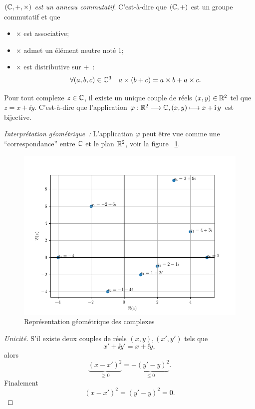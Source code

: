 \begin{prop}
    \emph{\((\mathbb{C},+,\times)\) est un anneau commutatif}. C'est-à-dire que 
    \((\mathbb{C},+)\) est un groupe commutatif et que
    \begin{itemize}
        \item \(\times\) est associative;
        \item \(\times\) admet un élément neutre noté \(1\);
        \item \(\times\) est distributive sur \(+\)~:
            \begin{equation}
                \forall (a,b,c) \in \mathbb{C}^3 \quad a \times (b+c)=a \times b+ a 
                \times c.
            \end{equation}
    \end{itemize}
\end{prop}
\begin{prop}
    Pour tout complexe \(z \in \mathbb{C}\), il existe un unique couple de réels \((x,y) 
    \in \mathbb{R}^2\) tel que \(z=x+\ii y\). C'est-à-dire que l'application 
    \(\varphi:\mathbb{R}^2 \longrightarrow \mathbb{C}, (x,y) \longmapsto x+\operatorname{i} y\) est bijective.
\end{prop}
\emph{Interprétation géométrique~:} L'application $\varphi$ peut être vue comme 
une ``correspondance'' entre $\mathbb{C}$ et le plan $\mathbb{R}^2$, voir la 
figure~
\ref{fig:complexe}.
\begin{figure}
    \centering
    \includegraphics[scale=0.8]{./Complexes.png}
    \caption{Représentation géométrique des complexes}
    \label{fig:complexe}
\end{figure}
\begin{proof}[Unicité]
    S'il existe deux couples de réels \((x,y),(x',y')\) tels que
    \begin{equation}
        x'+\ii y'=x +\ii y,
    \end{equation}
    alors
    \begin{equation}
        \underbrace{(x-x')^2}_{\geqslant 0}=\underbrace{-(y'-y)^2}_{\leqslant 0}.
    \end{equation}
    Finalement
    \begin{equation}
        (x-x')^2=(y'-y)^2=0.
    \end{equation}
\end{proof}

